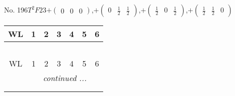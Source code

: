 \documentclass[fleqn,9pt,landscape]{jsarticle}
\begin{document}
\newpage
No. 196\quad$T_{}^{2}$\quad$F23$\quad[ cubic ]\quad$+\begin{pmatrix} 0 & 0 & 0 \end{pmatrix}$,\quad $+\begin{pmatrix} 0 & \frac{1}{2} & \frac{1}{2} \end{pmatrix}$,\quad $+\begin{pmatrix} \frac{1}{2} & 0 & \frac{1}{2} \end{pmatrix}$,\quad $+\begin{pmatrix} \frac{1}{2} & \frac{1}{2} & 0 \end{pmatrix}$
\begin{center}
\renewcommand{\arraystretch}{1.2}
\begin{longtable}{ccccccc}
 \hline \hline
WL & 1 & 2 & 3 & 4 & 5 & 6 \\ \hline \endfirsthead

\multicolumn{6}{l}{\tablename\ \thetable{}} \\
 \hline \hline
WL & 1 & 2 & 3 & 4 & 5 & 6 \\ \hline \endhead

 \hline \hline
\multicolumn{6}{r}{\footnotesize\it continued ...} \\ \endfoot

 \hline \hline
\multicolumn{6}{r}{} \\ \endlastfoot


\end{longtable}
\end{center}
\end{document}
